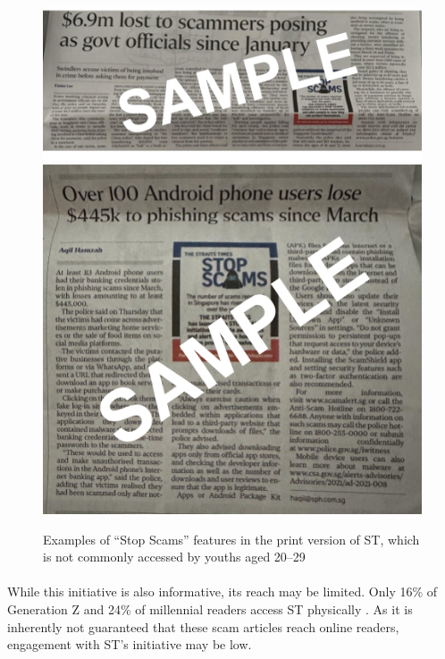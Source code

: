 \documentclass[a4paper]{article}
\begin{document}
\begin{figure}[ht!]
   \centering
  \includegraphics[width=\textwidth]{stopscams1} \endminipage\hfill
   \centering
  \includegraphics[width=\textwidth]{stopscams2} \endminipage{}
  \caption{Examples of “Stop Scams” features in the print version of ST, which
    is not commonly accessed by youths aged 20--29}\label{fig:stopcams}
\end{figure}

\paragraph{} While this initiative is also informative, its reach may be
limited. Only 16\% of Generation Z and 24\% of millennial readers access ST
physically \parencite{Ho.2021}. As it is inherently not guaranteed that these
scam articles reach online readers, engagement with ST’s initiative may be low.
\end{document}
